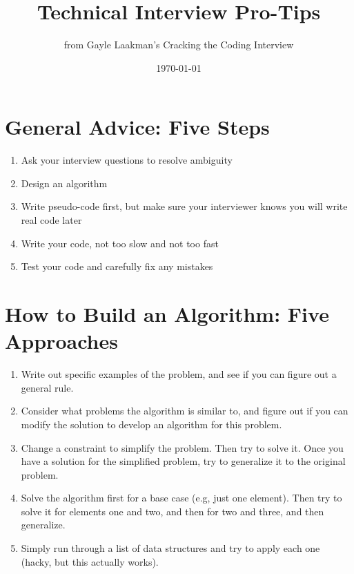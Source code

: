 \documentclass[11pt]{article}
\title{Technical Interview Pro-Tips}
\author{from Gayle Laakman's Cracking the Coding Interview}
\date{\today}
\begin{document}
\maketitle

\section{General Advice: Five Steps}

\begin{enumerate}
\item Ask your interview questions to resolve ambiguity
\item Design an algorithm
\item Write pseudo-code first, but make sure your interviewer knows you will write real code later
\item Write your code, not too slow and not too fast
\item Test your code and carefully fix any mistakes
\end{enumerate}

\section{How to Build an Algorithm: Five Approaches}

\begin{enumerate}
\item Write out specific examples of the problem, and see if you can figure out a general rule.
\item Consider what problems the algorithm is similar to, and figure out if you can modify
      the solution to develop an algorithm for this problem.
\item Change a constraint to simplify the problem. Then try to solve it. Once you have a
      solution for the simplified problem, try to generalize it to the original problem.
\item Solve the algorithm first for a base case (e.g, just one element). Then try to solve it
      for elements one and two, and then for two and three, and then generalize.
\item Simply run through a list of data structures and try to apply each one (hacky, but this
      actually works).
\end{enumerate}
\end{document}
